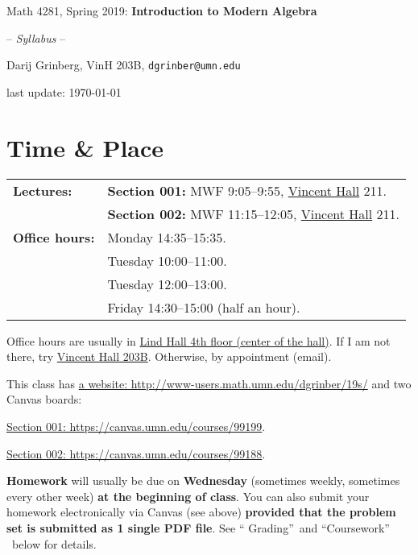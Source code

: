 \documentclass[numbers=enddot,12pt,final,onecolumn,notitlepage]{scrartcl}%
\theoremstyle{definition}
\begin{document}
\begin{center}
Math 4281, Spring 2019: \textbf{Introduction to Modern Algebra}

-- \textit{Syllabus} --

Darij Grinberg, VinH 203B, \texttt{dgrinber@umn.edu}

last update: \today



\end{center}

\section{Time \& Place}%

\begin{tabular}
[c]{|ll|}\hline
\textbf{Lectures:} & \textbf{Section 001:} MWF 9:05--9:55,
\href{http://campusmaps.umn.edu/vincent-hall}{Vincent Hall} 211.\\
& \textbf{Section 002:} MWF 11:15--12:05,
\href{http://campusmaps.umn.edu/vincent-hall}{Vincent Hall} 211.\\\hline
\textbf{Office hours:} & Monday 14:35--15:35.\\
& Tuesday 10:00--11:00.\\
& Tuesday 12:00--13:00.\\
& Friday 14:30--15:00 (half an hour).\\\hline
\end{tabular}


\vspace{0.1cm}Office hours are usually in
\href{http://campusmaps.umn.edu/lind-hall}{Lind Hall 4th floor (center of the
hall)}. If I am not there, try
\href{http://campusmaps.umn.edu/vincent-hall}{Vincent Hall 203B}. Otherwise,
by appointment (email).

\bigskip

This class has \href{http://www-users.math.umn.edu/~dgrinber/19s/}{a website:
http://www-users.math.umn.edu/dgrinber/19s/} and two Canvas boards:

\qquad\href{https://canvas.umn.edu/courses/99199}{Section 001:
https://canvas.umn.edu/courses/99199}.

\qquad\href{Section 002: https://canvas.umn.edu/courses/99188}{Section 002:
https://canvas.umn.edu/courses/99188}.

\bigskip

\textbf{Homework} will usually be due on \textbf{Wednesday} (sometimes weekly,
sometimes every other week) \textbf{at the beginning of class}. You can also
submit your homework electronically via Canvas (see above) \textbf{provided
that the problem set is submitted as 1 single PDF file}. See \textquotedblleft
Grading\textquotedblright\ and \textquotedblleft Coursework\textquotedblright%
\ below for details.
\end{document}
